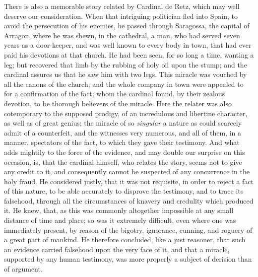 \documentclass[]{article}
\begin{document}
\begin{sectionbody}
\humeparagraph  There is also a memorable story related by Cardinal de Retz, which may well deserve our consideration. When that intriguing politician fled into Spain, to avoid the persecution of his enemies, he passed through Saragossa, the capital of Arragon, where he was shewn, in the cathedral, a man, who had served seven years as a door-keeper, and was well known to every body in town, that had ever paid his devotions at that church. He had been seen, for so long a time, wanting a leg; but recovered that limb by the rubbing of holy oil upon the stump; and the cardinal assures us that he saw him with two legs. This miracle was vouched by all the canons of the church; and the whole company in town were appealed to for a confirmation of the fact; whom the cardinal found, by their zealous devotion, to be thorough believers of the miracle. Here the relater was also cotemporary to the supposed prodigy, of an incredulous and libertine character, as well as of great genius; the miracle of so \emph{singular} a nature as could scarcely admit of a counterfeit, and the witnesses very numerous, and all of them, in a manner, spectators of the fact, to which they gave their testimony. And what adds mightily to the force of the evidence, and may double our surprise on this occasion, is, that the cardinal himself, who relates the story, seems not to give any credit to it, and consequently cannot be suspected of any concurrence in the holy fraud. He considered justly, that it was not requisite, in order to reject a fact of this nature, to be able accurately to disprove the testimony, and to trace its falsehood, through all the circumstances of knavery and credulity which produced it. He knew, that, as this was commonly altogether impossible at any small distance of time and place; so was it extremely difficult, even where one was immediately present, by reason of the bigotry, ignorance, cunning, and roguery of a great part of mankind. He therefore concluded, like a just reasoner, that such an evidence carried falsehood upon the very face of it, and that a miracle, supported by any human testimony, was more properly a subject of derision than of argument.


\end{sectionbody}
\end{document}
